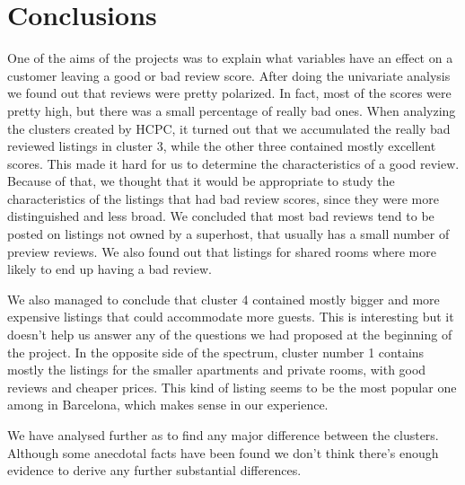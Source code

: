 

\section{Conclusions}%
\label{sec:conclusions}

One of the aims of the projects was to explain what variables have an effect on a customer leaving a good or bad review score. After doing the univariate analysis we found out that reviews were pretty polarized.  In fact, most of the scores were pretty high, but there was a small percentage of really bad ones. When analyzing the clusters created by HCPC, it turned out that we accumulated the really bad reviewed listings in cluster 3, while the other three contained mostly excellent scores. This made it hard for us to determine the characteristics of a good review. Because of that, we thought that it would be appropriate to study the characteristics of the listings that had bad review scores, since they were more distinguished and less broad. We concluded that most bad reviews tend to be posted on listings not owned by a superhost, that usually has a small number of preview reviews. We also found out that listings for shared rooms where more likely to end up having a bad review.

We also managed to conclude that cluster 4 contained mostly bigger and more expensive listings that could accommodate more guests. This is interesting but it doesn't help us answer any of the questions we had proposed at the beginning of the project.
In the opposite side of the spectrum,  cluster number 1 contains mostly the listings for the smaller apartments and private rooms, with good reviews and cheaper prices. This kind of listing seems to be the most popular one among \airbnb in Barcelona, which makes sense in our experience.

We have analysed further as to find any major difference between the clusters. Although some anecdotal facts have been found we don't think there's enough evidence to derive any further substantial differences.